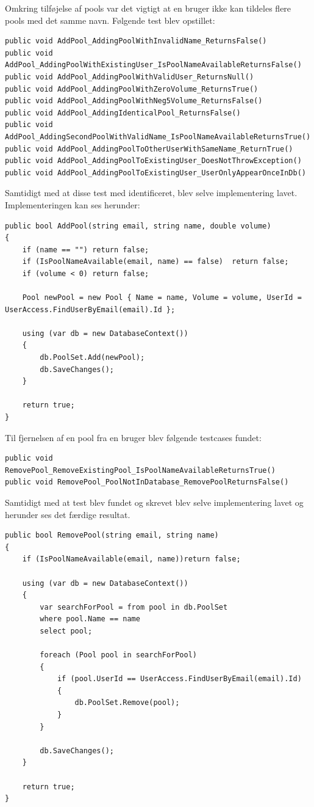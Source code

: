 Omkring tilføjelse af pools var det vigtigt at en bruger ikke kan tildeles flere pools med det samme navn. Følgende test blev opstillet:

\begin{lstlisting}
public void AddPool_AddingPoolWithInvalidName_ReturnsFalse()
public void AddPool_AddingPoolWithExistingUser_IsPoolNameAvailableReturnsFalse()
public void AddPool_AddingPoolWithValidUser_ReturnsNull()
public void AddPool_AddingPoolWithZeroVolume_ReturnsTrue()
public void AddPool_AddingPoolWithNeg5Volume_ReturnsFalse()
public void AddPool_AddingIdenticalPool_ReturnsFalse()
public void AddPool_AddingSecondPoolWithValidName_IsPoolNameAvailableReturnsTrue()
public void AddPool_AddingPoolToOtherUserWithSameName_ReturnTrue()
public void AddPool_AddingPoolToExistingUser_DoesNotThrowException()
public void AddPool_AddingPoolToExistingUser_UserOnlyAppearOnceInDb()
\end{lstlisting}

Samtidigt med at disse test med identificeret, blev selve implementering lavet. Implementeringen kan ses herunder: 

\begin{lstlisting}
public bool AddPool(string email, string name, double volume)
{
	if (name == "")	return false;
	if (IsPoolNameAvailable(email, name) == false)	return false;
	if (volume < 0)	return false;
	
	Pool newPool = new Pool { Name = name, Volume = volume, UserId = UserAccess.FindUserByEmail(email).Id };
	
	using (var db = new DatabaseContext())
	{
		db.PoolSet.Add(newPool);
		db.SaveChanges();
	}
	
	return true;
}
\end{lstlisting}

Til fjernelsen af en pool fra en bruger blev følgende testcases fundet:

\begin{lstlisting}
public void RemovePool_RemoveExistingPool_IsPoolNameAvailableReturnsTrue()
public void RemovePool_PoolNotInDatabase_RemovePoolReturnsFalse()
\end{lstlisting}

Samtidigt med at test blev fundet og skrevet blev selve implementering lavet og herunder ses det færdige resultat.

\begin{lstlisting}
public bool RemovePool(string email, string name)
{
	if (IsPoolNameAvailable(email, name))return false;
	
	using (var db = new DatabaseContext())
	{
		var searchForPool = from pool in db.PoolSet
		where pool.Name == name
		select pool;
		
		foreach (Pool pool in searchForPool)
		{
			if (pool.UserId == UserAccess.FindUserByEmail(email).Id)
			{
				db.PoolSet.Remove(pool);
			}
		}
	
		db.SaveChanges();
	}
	
	return true;
}
\end{lstlisting}

